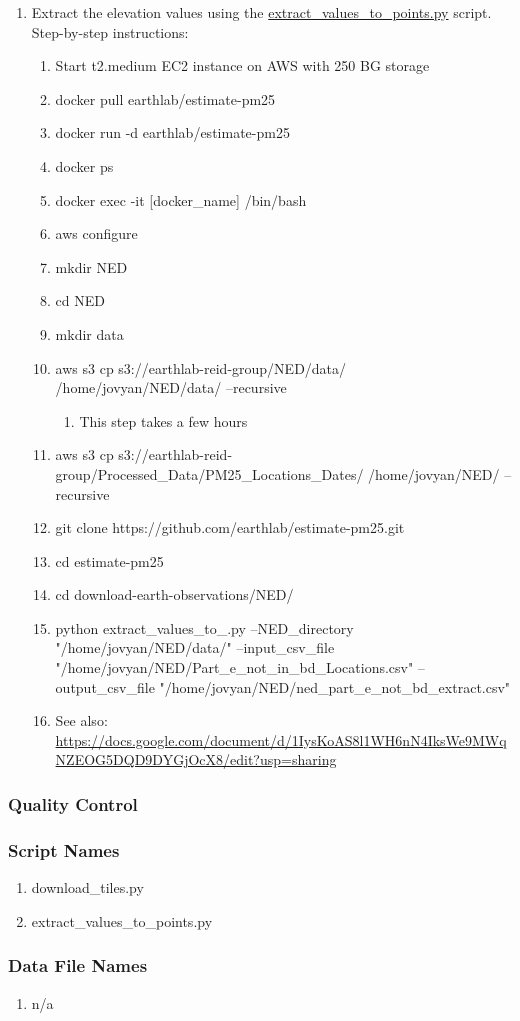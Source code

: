 \begin{enumerate}
\item Extract the elevation values using the \href{https://github.com/earthlab/estimate-pm25/blob/master/download-earth-observations/NED/extract_values_to_points.py}{extract\_values\_to\_points.py} script. Step-by-step instructions:
	\begin{enumerate}
	\item Start t2.medium EC2 instance on AWS with 250 BG storage
	\item docker pull earthlab/estimate-pm25
	\item docker run -d earthlab/estimate-pm25
	\item docker ps
	\item docker exec -it [docker\_name] /bin/bash
	\item aws configure
	\item mkdir NED
	\item cd NED
	\item mkdir data 
	\item aws s3 cp s3://earthlab-reid-group/NED/data/ /home/jovyan/NED/data/ --recursive 
		\begin{enumerate}
		\item This step takes a few hours
		\end{enumerate}
	\item aws s3 cp s3://earthlab-reid-group/Processed\_Data/PM25\_Locations\_Dates/ /home/jovyan/NED/ --recursive
	\item git clone https://github.com/earthlab/estimate-pm25.git
	\item cd estimate-pm25
	\item cd download-earth-observations/NED/
	\item python extract\_values\_to_\points.py --NED\_directory "/home/jovyan/NED/data/" --input\_csv\_file "/home/jovyan/NED/Part\_e\_not\_in\_bd\_Locations.csv" --output\_csv\_file "/home/jovyan/NED/ned\_part\_e\_not\_bd\_extract.csv"
	\item See also: \url{https://docs.google.com/document/d/1IysKoAS8l1WH6nN4IksWe9MWqNZEOG5DQD9DYGjOcX8/edit?usp=sharing}
	\end{enumerate}




\end{enumerate}
\subsubsection*{Quality Control}
\subsubsection*{Script Names}
\begin{enumerate}
\item download\_tiles.py
\item extract\_values\_to\_points.py
\end{enumerate}
\subsubsection*{Data File Names}
\begin{enumerate}
\item n/a
\end{enumerate}